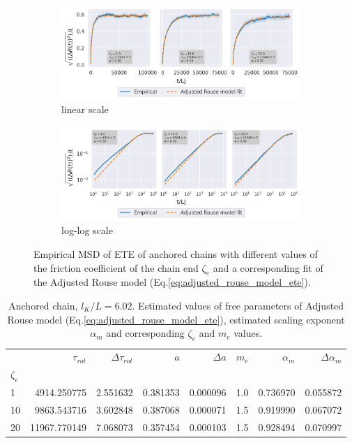 \documentclass[
    paper=A4,pagesize=automedia,fontsize=12pt,
    BCOR=15mm,DIV=22,
    twoside,headinclude,footinclude=false,
    fleqn,             %
    bibliography=totocnumbered,          %
    listof=totoc,                %
    listof=flat,                 %
    cleardoublepage=empty      %
    numbers=endperiod
]{scrartcl}
\begin{document}
\begin{figure}
    \centering
    \begin{subfigure}[b]{\textwidth}
        \centering
        \includegraphics[width=\textwidth]{14+15+16-exp-msd-log-arm_fit.png}
        \caption{linear scale}
        \label{fig:msd_anchored_zeta-arm_fit-normal}
    \end{subfigure}
    \begin{subfigure}[b]{\textwidth}
        \centering
        \includegraphics[width=\textwidth]{14+15+16-exp-msd-log-arm_fit-log.png}
        \caption{log-log scale}
        \label{fig:msd_anchored_zeta-arm_fit-log}
    \end{subfigure}
    \caption{Empirical MSD of ETE of anchored chains with different values of
    the friction coefficient of the chain end $\zeta_e$ and a corresponding fit
    of the Adjusted Rouse model (Eq.\ref{eq:adjusted_rouse_model_ete}).
    }
    \label{fig:msd_anchored_zeta-arm_fit}
\end{figure}

\begin{table}
    \centering
    \begin{tabular}{lrrrrrrr}
        \toprule
         & $\tau_{rot}$ & $\Delta \tau_{rot}$ & $a$ & $\Delta a$ & $m_e$ & $\alpha_m$ & $\Delta \alpha_m $\\
        $\zeta_e$ &  &  &  &  &  &  &  \\
        \midrule
        1 & 4914.250775 & 2.551632 & 0.381353 & 0.000096 & 1.0 & 0.736970 & 0.055872 \\
        10 & 9863.543716 & 3.602848 & 0.387068 & 0.000071 & 1.5 & 0.919990 & 0.067072 \\
        20 & 11967.770149 & 7.068073 & 0.357454 & 0.000103 & 1.5 & 0.928494 & 0.070997 \\
        \bottomrule
    \end{tabular}
    \caption{
        Anchored chain, $l_K/L=6.02$. 
        Estimated values of free parameters of Adjusted Rouse model (Eq.\ref{eq:adjusted_rouse_model_ete}),
        estimated scaling exponent $\alpha_m$ and corresponding $\zeta_e$ and $m_e$ values.
    }
    \label{table:anchored_chain_zeta_estimations}
\end{table}
\end{document}
